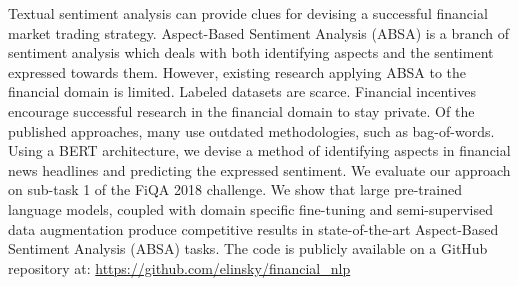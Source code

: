 Textual sentiment analysis can provide clues for devising a successful financial market trading strategy. Aspect-Based Sentiment Analysis (ABSA) is a branch of sentiment analysis which deals with both identifying aspects and the sentiment expressed towards them. However, existing research applying ABSA to the financial domain is limited. Labeled datasets are scarce. Financial incentives encourage successful research in the financial domain to stay private. Of the published approaches, many use outdated methodologies, such as bag-of-words. Using a BERT architecture, we devise a method of identifying aspects in financial news headlines and predicting the expressed sentiment. We evaluate our approach on sub-task 1 of the FiQA 2018 challenge. We show that large pre-trained language models, coupled with domain specific fine-tuning and semi-supervised data augmentation produce competitive results in state-of-the-art Aspect-Based Sentiment Analysis (ABSA) tasks. The code is publicly available on a GitHub repository at: \href{https://github.com/elinsky/financial_nlp}{https://github.com/elinsky/financial\_nlp}
